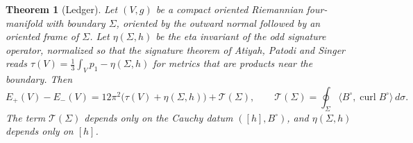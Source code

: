 \documentclass[11pt,letterpaper]{article}
\numberwithin{equation}{section}
\newtheorem{theorem}{Theorem}[section]
\theoremstyle{definition}
\DeclareMathOperator{\curl}{curl}
\newcommand{\cT}{\mathcal T}
\begin{document}
\begin{theorem}[Ledger]\label{thm:ledger}
Let \((V,g)\) be a compact oriented Riemannian four-manifold with
boundary \(\Sigma\), oriented by the outward normal followed by an oriented
frame of \(\Sigma\). Let \(\eta(\Sigma,h)\) be the eta invariant of the
odd signature operator, normalized so that the signature theorem of
Atiyah, Patodi and Singer \cite[Theorem 4.14]{APS1975SpectralI} reads
\(\tau(V)=\tfrac13\int_Vp_1-\eta(\Sigma,h)\) for metrics that are products
near the boundary. Then
\begin{equation}\label{eq:ledger}
 E_+(V)-E_-(V)=12\pi^2\bigl(\tau(V)+\eta(\Sigma,h)\bigr)+\cT(\Sigma),
 \qquad
 \cT(\Sigma)=\oint_\Sigma\langle B^\circ,\curl B^\circ\rangle\,d\sigma .
\end{equation}
The term \(\cT(\Sigma)\) depends only on the Cauchy datum
\(([h],B^\circ)\), and \(\eta(\Sigma,h)\) depends only on \([h]\).
\end{theorem}
\end{document}
